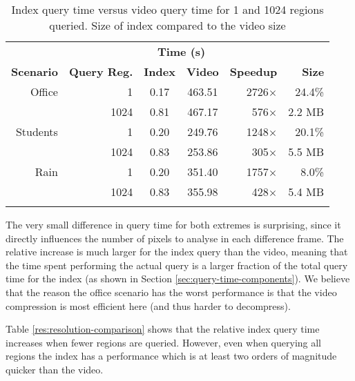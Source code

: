 \begin{table}[t]
    \caption{Index query time versus video query time for 1 and 1024 regions queried. Size of index compared to the video size}\label{res:scenario-comparison}
	\centering
    \begin{tabular}{r r c c r r}
		~ & ~ & \multicolumn{2}{c}{\textbf{Time (s)}} & ~ & \\
		\cline{3-4}
	    \textbf{Scenario} & \textbf{Query Reg.} & \textbf{Index} & \textbf{Video} & \textbf{Speedup} & \textbf{Size}  \\ \hline\noalign{\smallskip}
	    Office   & 1               & 0.17       & 463.51     & 2726$\times$  & 24.4\% \\
	    ~        & 1024            & 0.81       & 467.17     & 576$\times$   & 2.2 MB     \\\noalign{\smallskip} \hline\noalign{\smallskip}
	    Students & 1               & 0.20       & 249.76     & 1248$\times$  & 20.1\% \\
	    ~        & 1024            & 0.83       & 253.86     & 305$\times$   & 5.5 MB     \\\noalign{\smallskip} \hline\noalign{\smallskip}
	    Rain     & 1               & 0.20       & 351.40     & 1757$\times$  & 8.0\% \\
	    ~        & 1024            & 0.83       & 355.98     & 428$\times$   & 5.4 MB     \\\noalign{\smallskip} \hline
	    \end{tabular}
\end{table}

The very small difference in query time for both extremes is surprising, since it directly influences the number of pixels to analyse in each difference frame. The relative increase is much larger for the index query than the video, meaning that the time spent performing the actual query is a larger fraction of the total query time for the index (as shown in Section \ref{sec:query-time-components}). We believe that the reason the office scenario has the worst performance is that the video compression is most efficient here (and thus harder to decompress).

Table \ref{res:resolution-comparison} shows that the relative index query time increases when fewer regions are queried. However, even when querying all regions the index has a performance which is at least two orders of magnitude quicker than the video.

